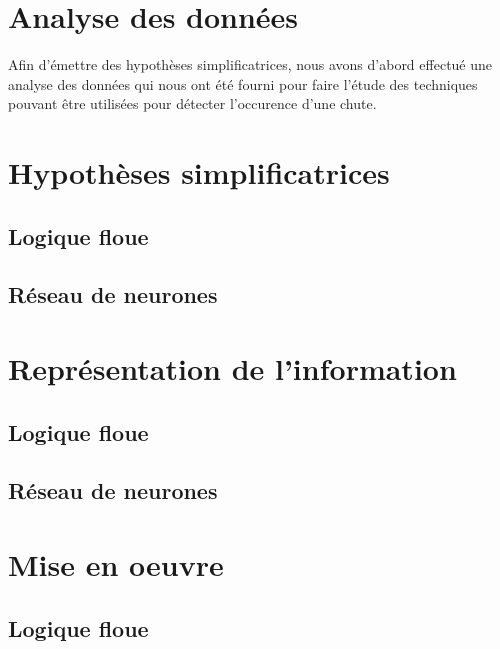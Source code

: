 \documentclass[12pt,letterpaper]{article}
\begin{document}
\section{Analyse des données} %
Afin d'émettre des hypothèses simplificatrices, nous avons d'abord effectué une analyse des données qui nous ont été fourni pour faire l'étude des techniques pouvant être utilisées pour détecter l'occurence d'une chute.


\section{Hypothèses simplificatrices}

\subsection{Logique floue}

\subsection{Réseau de neurones} %

\section{Représentation de l'information}

\subsection{Logique floue}

\subsection{Réseau de neurones} %


\section{Mise en oeuvre}

\subsection{Logique floue}
\end{document}
